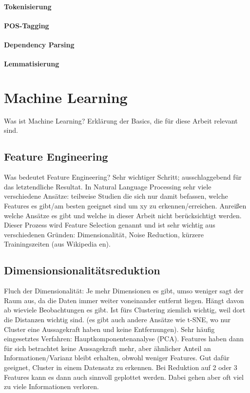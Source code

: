 \paragraph*{Tokenisierung}
\paragraph*{POS-Tagging}
\paragraph*{Dependency Parsing}
\paragraph*{Lemmatisierung}
\section{Machine Learning}
Was ist Machine Learning? Erklärung der Basics, die für diese Arbeit relevant sind.
\subsection{Feature Engineering}
Was bedeutet Feature Engineering? Sehr wichtiger Schritt; ausschlaggebend für das letztendliche Resultat. In Natural Language Processing sehr viele verschiedene Ansätze: teilweise Studien die sich nur damit befassen, welche Features es gibt/am besten geeignet sind um xy zu erkennen/erreichen. Anreißen welche Ansätze es gibt und welche in dieser Arbeit nicht berücksichtigt werden. Dieser Prozess wird Feature Selection genannt und ist sehr wichtig aus verschiedenen Gründen: Dimensionalität, Noise Reduction, kürzere Trainingszeiten (aus Wikipedia en).
\subsection{Dimensionsionalitätsreduktion}
Fluch der Dimensionalität: Je mehr Dimensionen es gibt, umso weniger sagt der Raum aus, da die Daten immer weiter voneinander entfernt liegen. Hängt davon ab wieviele Beobachtungen es gibt. Ist fürs Clustering ziemlich wichtig, weil dort die Distanzen wichtig sind. (es gibt auch andere Ansätze wie t-SNE, wo nur Cluster eine Aussagekraft haben und keine Entfernungen). Sehr häufig eingesetztes Verfahren: Hauptkomponentenanalyse (PCA). Features haben dann für sich betrachtet keine Aussagekraft mehr, aber ähnlicher Anteil an Informationen/Varianz bleibt erhalten, obwohl weniger Features. Gut dafür geeignet, Cluster in einem Datensatz zu erkennen. Bei Reduktion auf 2 oder 3 Features kann es dann auch sinnvoll geplottet werden. Dabei gehen aber oft viel zu viele Informationen verloren.

